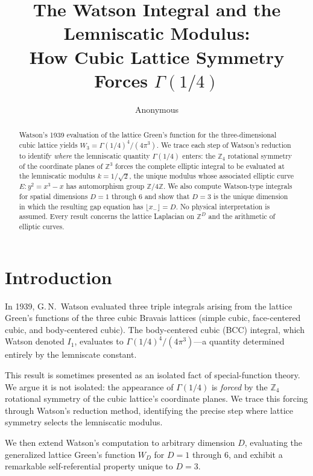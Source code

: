 \documentclass[12pt]{article}
\title{\textbf{The Watson Integral and the Lemniscatic Modulus: \\[0.3cm]
How Cubic Lattice Symmetry Forces $\Gamma(1/4)$}}
\author{Anonymous}
\date{}
\theoremstyle{definition}
\theoremstyle{remark}
\begin{document}
\maketitle

\begin{abstract}
\noindent Watson's 1939 evaluation of the lattice Green's function for the three-dimensional cubic lattice yields $W_3 = \Gamma(1/4)^4/(4\pi^3)$. We trace each step of Watson's reduction to identify \emph{where} the lemniscatic quantity $\Gamma(1/4)$ enters: the $\mathbb{Z}_4$ rotational symmetry of the coordinate planes of $\mathbb{Z}^3$ forces the complete elliptic integral to be evaluated at the lemniscatic modulus $k = 1/\sqrt{2}$, the unique modulus whose associated elliptic curve $E\!: y^2 = x^3 - x$ has automorphism group $\mathbb{Z}/4\mathbb{Z}$. We also compute Watson-type integrals for spatial dimensions $D = 1$ through $6$ and show that $D = 3$ is the unique dimension in which the resulting gap equation has $\lfloor x_- \rfloor = D$. No physical interpretation is assumed. Every result concerns the lattice Laplacian on $\mathbb{Z}^D$ and the arithmetic of elliptic curves.
\end{abstract}

\tableofcontents

\section{Introduction}

In 1939, G.\,N.\ Watson \cite{watson1939} evaluated three triple integrals arising from the lattice Green's functions of the three cubic Bravais lattices (simple cubic, face-centered cubic, and body-centered cubic). The body-centered cubic (BCC) integral, which Watson denoted $I_1$, evaluates to $\Gamma(1/4)^4/(4\pi^3)$---a quantity determined entirely by the lemniscate constant.

This result is sometimes presented as an isolated fact of special-function theory. We argue it is not isolated: the appearance of $\Gamma(1/4)$ is \emph{forced} by the $\mathbb{Z}_4$ rotational symmetry of the cubic lattice's coordinate planes. We trace this forcing through Watson's reduction method, identifying the precise step where lattice symmetry selects the lemniscatic modulus.

We then extend Watson's computation to arbitrary dimension $D$, evaluating the generalized lattice Green's function $W_D$ for $D = 1$ through $6$, and exhibit a remarkable self-referential property unique to $D = 3$.
\end{document}
